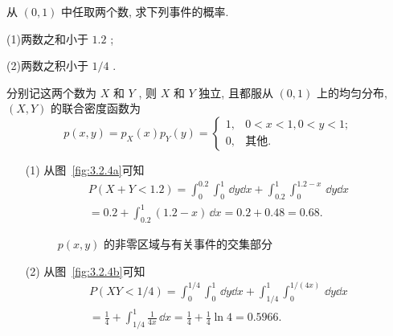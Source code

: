    \begin{example}\label{exam:3.2.8}
   	从 $(0,1)$ 中任取两个数, 求下列事件的概率.
   	
   	(1)两数之和小于 $1.2$ ;
   	
   	(2)两数之积小于 $1/4$ .
   \end{example}
   \begin{solution}
   	分别记这两个数为 $X$ 和 $Y$ , 则 $X$ 和 $Y$ 独立, 且都服从 $(0,1)$ 上的均匀分布, $(X,Y)$ 的联合密度函数为
   	\begin{equation*}
   		p(x,y)=p_{X}(x)p_{Y}(y)=
   		\begin{cases}
   		1, & 0<x<1,0<y<1;\\
   		0, & \text{其他}.
   		\end{cases}
   	\end{equation*}
   	\begin{itemize}
   		\item[(1)] 从图~\ref{fig:3.2.4a}可知
   		\begin{align*}
   			P(X+Y<1.2)=\int_{0}^{0.2}\int_{0}^{1}\,\dd y\dd x+\int_{0.2}^{1}\int_{0}^{1.2-x}\,\dd y\dd x\\
   			=0.2+\int_{0.2}^{1}(1.2-x)\,\dd x=0.2+0.48=0.68.
   		\end{align*}
   		\begin{figure}[h]
   			\centering
   			\qquad
   			\caption{ $p(x,y)$ 的非零区域与有关事件的交集部分}\label{fig:3.2.4}
   		\end{figure}
   	\item[(2)] 从图~\ref{fig:3.2.4b}可知
   	\begin{align*}
   		P(XY<1/4)=\int_{0}^{1/4}\int_{0}^{1}\,\dd y\dd x+\int_{1/4}^{1}\int_{0}^{1/(4x)}\,\dd y\dd x\\
   		=\frac{1}{4}+\int_{1/4}^{1}\frac{1}{4x}\,\dd x=\frac{1}{4}+\frac{1}{4}\ln4=0.5966.
   	\end{align*}
   	\end{itemize}
   \end{solution}

